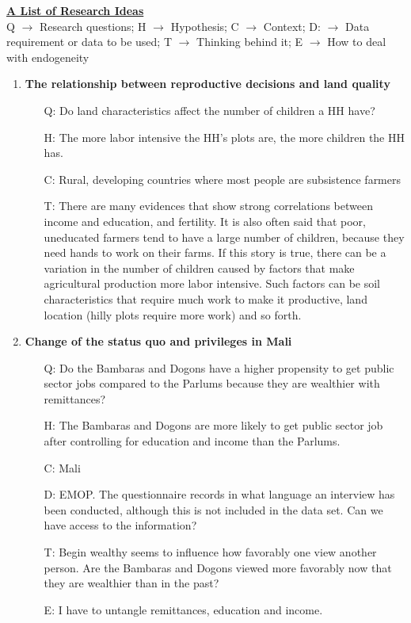 \documentclass[12pt]{article}
\begin{document}
\textbf{\underline{A List of Research Ideas}} \\
Q $\rightarrow$ Research questions; H $\rightarrow$ Hypothesis; C $\rightarrow$ Context; D: $\rightarrow$ Data requirement or data to be used; T $\rightarrow$ Thinking behind it; E $\rightarrow$ How to deal with endogeneity
\begin{enumerate}
	\item \textbf{The relationship between reproductive decisions and land quality}
		\begin{itemize}
			\item[Q:] Do land characteristics affect the number of children a HH have?
			\item[H:] The more labor intensive the HH's plots are, the more children the HH has.
			\item[C:] Rural, developing countries where most people are subsistence farmers 
			\item[T:] There are many evidences that show strong correlations between income and education, and fertility. It is also often said that poor, uneducated farmers tend to have a large number of children, because they need hands to work on their farms. If this story is true, there can be a variation in the number of children caused by factors that make agricultural production more labor intensive. Such factors can be soil characteristics that require much work to make it productive, land location (hilly plots require more work) and so forth.
		\end{itemize}
		
	\item \textbf{Change of the status quo and privileges in Mali}
		\begin{itemize}
			\item[Q:] Do the Bambaras and Dogons have a higher propensity to get public sector jobs compared to the Parlums because they are wealthier with remittances?
			\item[H:] The Bambaras and Dogons are more likely to get public sector job after controlling for education and income than the Parlums.
			\item[C:] Mali
			\item[D:] EMOP. The questionnaire records in what language an interview has been conducted, although this is not included in the data set. Can we have access to the information?
			\item[T:] Begin wealthy seems to influence how favorably one view another person. Are the Bambaras and Dogons viewed more favorably now that they are wealthier than in the past?
			\item[E:] I have to untangle remittances, education and income.
		\end{itemize}
	

\end{enumerate}
\end{document}
